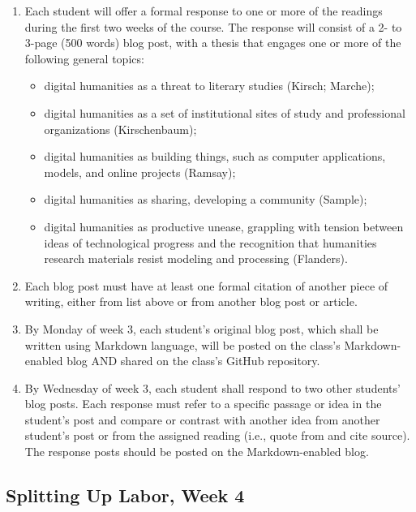 \documentclass[]{article}
\begin{document}
\begin{enumerate}
\def\labelenumi{\arabic{enumi}.}
\item
  Each student will offer a formal response to one or more of the
  readings during the first two weeks of the course. The response will
  consist of a 2- to 3-page (500 words) blog post, with a thesis that
  engages one or more of the following general topics:

  \begin{itemize}
  \itemsep1pt\parskip0pt
  \item
    digital humanities as a threat to literary studies (Kirsch; Marche);
  \item
    digital humanities as a set of institutional sites of study and
    professional organizations (Kirschenbaum);
  \item
    digital humanities as building things, such as computer
    applications, models, and online projects (Ramsay);
  \item
    digital humanities as sharing, developing a community (Sample);
  \item
    digital humanities as productive unease, grappling with tension
    between ideas of technological progress and the recognition that
    humanities research materials resist modeling and processing
    (Flanders).
  \end{itemize}
\item
  Each blog post must have at least one formal citation of another piece
  of writing, either from list above or from another blog post or
  article.
\item
  By Monday of week 3, each student's original blog post, which shall be
  written using Markdown language, will be posted on the class's
  Markdown-enabled blog AND shared on the class's GitHub repository.
\item
  By Wednesday of week 3, each student shall respond to two other
  students' blog posts. Each response must refer to a specific passage
  or idea in the student's post and compare or contrast with another
  idea from another student's post or from the assigned reading (i.e.,
  quote from and cite source). The response posts should be posted on
  the Markdown-enabled blog.
\end{enumerate}

\subsection{Splitting Up Labor, Week 4}\label{splitting-up-labor-week-4}
\end{document}

